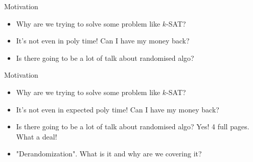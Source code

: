 \documentclass[pdf] {beamer}
\begin{document}
	\begin{frame}{Motivation}
		\begin{itemize}[FAQ]
			\item<1-> Why are we trying to solve some problem like $k$-SAT?
			\item<1-> It's not even in poly time! Can I have my money back?
			\item<2-> Is there going to be a lot of talk about randomised algo?
		\end{itemize}
	\end{frame}
	\begin{frame}{Motivation}
		\begin{itemize}[FAQ]
			\item<1-> Why are we trying to solve some problem like $k$-SAT?
			\item<1-> It's not even in expected poly time! Can I have my money back?
			\item<1-> Is there going to be a lot of talk about randomised algo? Yes! 4 full pages. What a deal!
			\item<2-> "Derandomization". What is it and why are we 
						covering it?
		\end{itemize}
	\end{frame}
\end{document}
